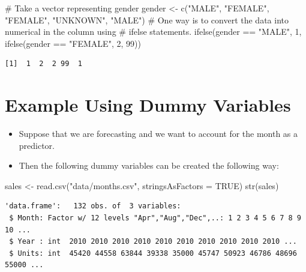\documentclass[
  letterpaper,
  DIV=11,
  numbers=noendperiod]{scrreprt}
\newenvironment{Shaded}{\begin{snugshade}}{\end{snugshade}}
\newcommand{\AttributeTok}[1]{\textcolor[rgb]{0.40,0.45,0.13}{#1}}
\newcommand{\CommentTok}[1]{\textcolor[rgb]{0.37,0.37,0.37}{#1}}
\newcommand{\ConstantTok}[1]{\textcolor[rgb]{0.56,0.35,0.01}{#1}}
\newcommand{\DecValTok}[1]{\textcolor[rgb]{0.68,0.00,0.00}{#1}}
\newcommand{\FunctionTok}[1]{\textcolor[rgb]{0.28,0.35,0.67}{#1}}
\newcommand{\NormalTok}[1]{\textcolor[rgb]{0.00,0.23,0.31}{#1}}
\newcommand{\OtherTok}[1]{\textcolor[rgb]{0.00,0.23,0.31}{#1}}
\newcommand{\SpecialCharTok}[1]{\textcolor[rgb]{0.37,0.37,0.37}{#1}}
\newcommand{\StringTok}[1]{\textcolor[rgb]{0.13,0.47,0.30}{#1}}
\providecommand{\tightlist}{%
  \setlength{\itemsep}{0pt}\setlength{\parskip}{0pt}}\usepackage{longtable,booktabs,array}
\begin{document}
\begin{Shaded}
\begin{Highlighting}[]
\CommentTok{\# Take a vector representing gender}
\NormalTok{gender }\OtherTok{\textless{}{-}} \FunctionTok{c}\NormalTok{(}\StringTok{"MALE"}\NormalTok{, }\StringTok{"FEMALE"}\NormalTok{, }\StringTok{"FEMALE"}\NormalTok{, }\StringTok{"UNKNOWN"}\NormalTok{, }\StringTok{"MALE"}\NormalTok{)}
\CommentTok{\# One way is to convert the data into numerical in the column using}
\CommentTok{\# ifelse statements.}
\FunctionTok{ifelse}\NormalTok{(gender }\SpecialCharTok{==} \StringTok{"MALE"}\NormalTok{, }\DecValTok{1}\NormalTok{, }\FunctionTok{ifelse}\NormalTok{(gender }\SpecialCharTok{==} \StringTok{"FEMALE"}\NormalTok{, }\DecValTok{2}\NormalTok{, }\DecValTok{99}\NormalTok{))}
\end{Highlighting}
\end{Shaded}

\begin{verbatim}
[1]  1  2  2 99  1
\end{verbatim}

\section{Example Using Dummy
Variables}\label{example-using-dummy-variables}

\begin{itemize}
\tightlist
\item
  Suppose that we are forecasting and we want to account for the month
  as a predictor.
\item
  Then the following dummy variables can be created the following way:
\end{itemize}

\begin{Shaded}
\begin{Highlighting}[]
\NormalTok{sales }\OtherTok{\textless{}{-}} \FunctionTok{read.csv}\NormalTok{(}\StringTok{"data/months.csv"}\NormalTok{, }\AttributeTok{stringsAsFactors =} \ConstantTok{TRUE}\NormalTok{)}
\FunctionTok{str}\NormalTok{(sales)}
\end{Highlighting}
\end{Shaded}

\begin{verbatim}
'data.frame':   132 obs. of  3 variables:
 $ Month: Factor w/ 12 levels "Apr","Aug","Dec",..: 1 2 3 4 5 6 7 8 9 10 ...
 $ Year : int  2010 2010 2010 2010 2010 2010 2010 2010 2010 2010 ...
 $ Units: int  45420 44558 63844 39338 35000 45747 50923 46786 48696 55000 ...
\end{verbatim}
\end{document}
